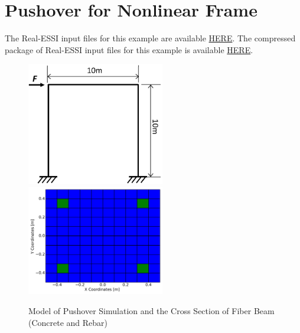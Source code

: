 \clearpage
\newpage
\section{Pushover for Nonlinear Frame}
\label{Pushover_for_Nonlinear_Frame}


The Real-ESSI input files for this example are available 
\href{http://cml01.engr.ucdavis.edu/shortCourse/Day1/Pushover_for_Nonlinear_Frame}{HERE}. 
The compressed package of Real-ESSI input files for this example is available 
\href{http://cml01.engr.ucdavis.edu/shortCourse/Day1/Pushover_for_Nonlinear_Frame/Pushover_for_Nonlinear_Frame.tgz}{HERE}. 

\begin{figure}[H]
  \centering
  \includegraphics[width = 6cm]{./Figure-files/Day1/Pushover_for_Nonlinear_Frame/overview.pdf}
  \includegraphics[width = 6cm]{./Figure-files/Day1/Pushover_for_Nonlinear_Frame/rectangle_rebar2.pdf}
  \caption{Model of Pushover Simulation and the Cross Section of Fiber Beam (Concrete and Rebar) }
  \label{fig_single_element_pushover}
\end{figure}

